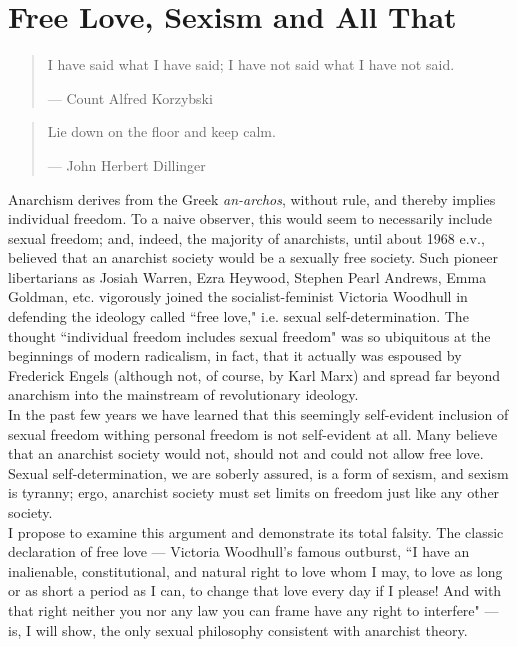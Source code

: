 \chapter{Free Love, Sexism and All That}

\blockquote{I have said what I have said; I have not said what I have not said.
\par\begin{flushright} --- Count Alfred Korzybski \end{flushright}
}
\blockquote{Lie down on the floor and keep calm.
\par\begin{flushright} --- John Herbert Dillinger \end{flushright}
}

Anarchism derives from the Greek \emph{an-archos}, without rule, and thereby implies individual freedom. To a naive observer, this would seem to necessarily include sexual freedom; and, indeed, the majority of anarchists, until about 1968 e.v., believed that an anarchist society would be a sexually free society. Such pioneer libertarians as Josiah Warren, Ezra Heywood, Stephen Pearl Andrews, Emma Goldman, etc. vigorously joined the socialist-feminist Victoria Woodhull in defending the ideology called ``free love," i.e. sexual self-determination. The thought ``individual freedom includes sexual freedom" was so ubiquitous at the beginnings of modern radicalism, in fact, that it actually was espoused by Frederick Engels (although not, of course, by Karl Marx) and spread far beyond anarchism into the mainstream of revolutionary ideology.\\
In the past few years we have learned that this seemingly self-evident inclusion of sexual freedom withing personal freedom is not self-evident at all. Many believe that an anarchist society would not, should not and could not allow free love. Sexual self-determination, we are soberly assured, is a form of sexism, and sexism is tyranny; ergo, anarchist society must set limits on freedom just like any other society.\\
I propose to examine this argument and demonstrate its total falsity. The classic declaration of free love --- Victoria Woodhull's famous outburst, ``I have an inalienable, constitutional, and natural right to love whom I may, to love as long or as short a period as I can, to change that love every day if I please! And with that right neither you nor any law you can frame have any right to interfere" --- is, I will show, the only sexual philosophy consistent with anarchist theory.\\
